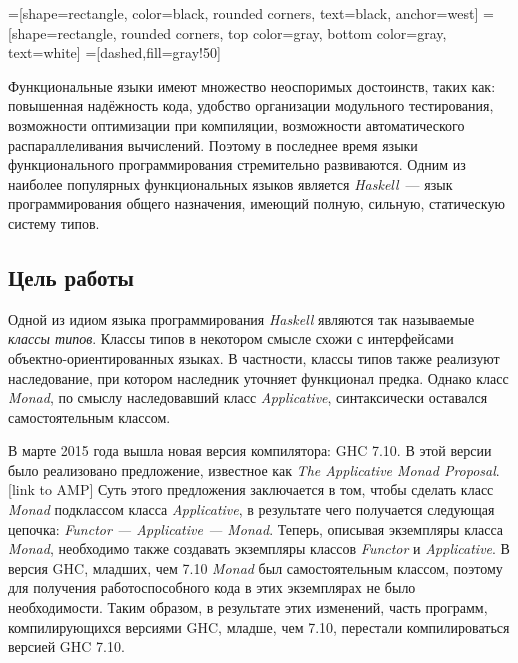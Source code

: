 



    =[shape=rectangle, color=black, rounded corners,%
    text=black, anchor=west]
    =[shape=rectangle, rounded corners,%
    top color=gray,%
    bottom color=gray, text=white]
    =[dashed,fill=gray!50]



\Intro

Функциональные языки имеют множество неоспоримых достоинств, таких как: повышенная надёжность кода, удобство организации модульного тестирования, возможности оптимизации при компиляции, возможности автоматического распараллеливания вычислений. Поэтому в последнее время языки функционального программирования стремительно развиваются. Одним из наиболее популярных функциональных языков является \textit{Haskell}~---  язык программирования общего назначения, имеющий полную, сильную, статическую систему типов.

\subsection*{Цель работы}
Одной из идиом языка программирования \textit{Haskell} являются так называемые \textit{классы типов}. Классы типов в некотором смысле схожи с интерфейсами  объектно-ориентированных языках. В частности, классы типов также реализуют наследование, при котором наследник уточняет функционал предка. Однако класс \textit{Monad}, по смыслу наследовавший класс \textit{Applicative}, синтаксически оставался самостоятельным классом.

В марте 2015 года вышла новая версия компилятора: GHC 7.10. В этой версии было реализовано предложение, известное как \textit{The Applicative Monad Proposal}.[link to AMP] Суть этого предложения заключается в том, чтобы сделать класс \textit{Monad} подклассом класса \textit{Applicative}, в результате чего получается следующая цепочка: \textit{Functor --- Applicative --- Monad}. Теперь, описывая экземпляры класса \textit{Monad}, необходимо также создавать экземпляры классов \textit{Functor} и \textit{Applicative}. В версия GHC, младших, чем 7.10 \textit{Monad} был самостоятельным классом, поэтому для получения работоспособного кода в этих экземплярах не было необходимости. Таким образом, в результате этих изменений, часть программ, компилирующихся версиями GHC, младше, чем 7.10, перестали компилироваться версией GHC 7.10.

